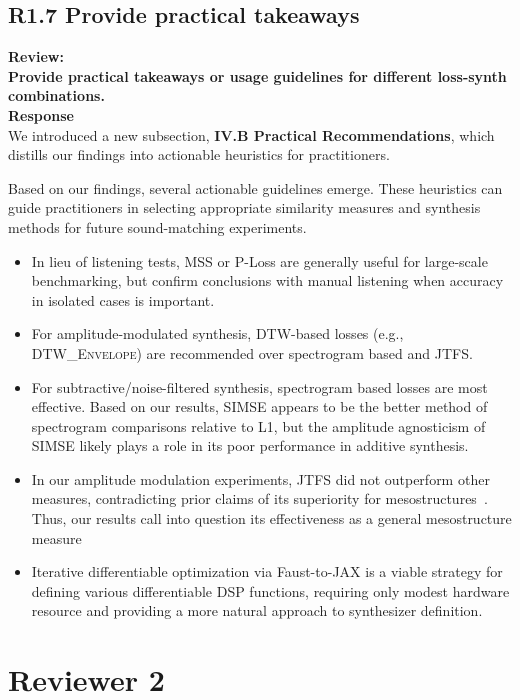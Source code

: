 \documentclass[11pt]{article}
\newcommand{\DTWEnv}{\textsc{DTW\_Envelope}}
\newcommand{\JTFS}{\textsc{JTFS}}
\begin{document}
\subsection{R1.7 Provide practical takeaways}
\label{R1.7}
\noindent\textbf{Review:} \\
\noindent \textbf{Provide practical takeaways or usage guidelines for different loss-synth combinations. } 
\\

\noindent\textbf{Response} \\
We introduced a new subsection, \textbf{IV.B Practical Recommendations}, which distills our findings into actionable heuristics for practitioners. 

\begin{displayquote}
    Based on our findings, several actionable guidelines emerge. These heuristics can guide practitioners in selecting appropriate similarity measures and synthesis methods for future sound-matching experiments.
\begin{itemize}
    \item In lieu of listening tests, MSS or P-Loss are generally useful for large-scale benchmarking, but confirm conclusions with manual listening when accuracy in isolated cases is important. 
    \item For amplitude-modulated synthesis, DTW-based losses (e.g., \DTWEnv{}) are recommended over spectrogram based and JTFS. 
    \item For subtractive/noise-filtered synthesis, spectrogram based losses are most effective. Based on our results, SIMSE appears to be the better method of spectrogram comparisons relative to L1, but the amplitude agnosticism of SIMSE likely plays a role in its poor performance in additive synthesis.  
    \item In our amplitude modulation experiments, \JTFS{} did not outperform other measures, contradicting prior claims of its superiority for mesostructures~\cite{vahidi2023mesostructures}. Thus, our results call into question its effectiveness as a general mesostructure measure
    \item Iterative differentiable optimization via Faust-to-JAX is a viable strategy for defining various differentiable DSP functions, requiring only modest hardware resource and providing a more natural approach to synthesizer definition.
\end{itemize}

\end{displayquote}
\section*{Reviewer 2}
\end{document}
